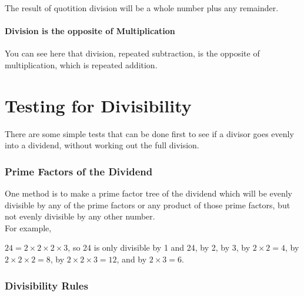 \documentclass{article}
\begin{document}
The result of quotition division will be a whole number plus any remainder.

\paragraph{Division is the opposite of Multiplication}

You can see here that division, repeated subtraction, is the opposite of multiplication, which is repeated addition.\\

\pagebreak

\section{Testing for Divisibility}

There are some simple tests that can be done first to see if a divisor goes evenly into a dividend, without working out the full division.\\

\subsubsection*{Prime Factors of the Dividend}

One method is to make a prime factor tree of the dividend which will be evenly divisible by any of the prime factors or any product of those prime factors, but not evenly divisible by any other number.\\

For example,\\

\begin{center}
\end{center}

$24 = 2 \times 2 \times 2 \times 3$, so 24 is only divisible by 1 and 24, by 2, by 3, by $2 \times 2 = 4$, by $2 \times 2 \times 2 = 8$, by $2 \times 2 \times 3 = 12$, and by $2 \times 3 = 6$.\\

\pagebreak

\subsubsection*{Divisibility Rules}
\end{document}
